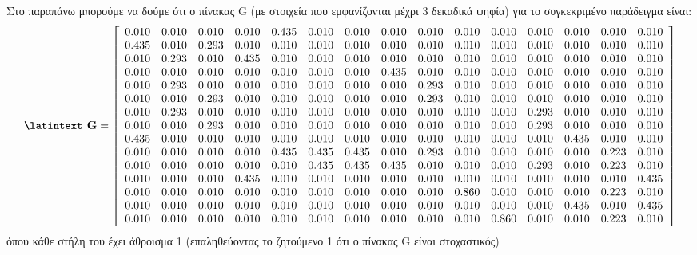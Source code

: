 \documentclass[a4paper,11pt]{article}
\newcommand{\lt}{\latintext}
\begin{document}
Στο παραπάνω μπορούμε να δούμε ότι ο πίνακας {\lt G} (με στοιχεία που εμφανίζονται μέχρι 3 δεκαδικά ψηφία) για το συγκεκριμένο παράδειγμα είναι:\\
\[\textbf{{\lt G}}=
    \left[ \begin{array}{ccccccccccccccc}
    0.010 & 0.010 & 0.010 & 0.010 & 0.435 & 0.010 & 0.010 & 0.010 & 0.010 & 0.010 & 0.010 & 0.010 & 0.010 & 0.010 & 0.010 \\
    0.435 & 0.010 & 0.293 & 0.010 & 0.010 & 0.010 & 0.010 & 0.010 & 0.010 & 0.010 & 0.010 & 0.010 & 0.010 & 0.010 & 0.010 \\
    0.010 & 0.293 & 0.010 & 0.435 & 0.010 & 0.010 & 0.010 & 0.010 & 0.010 & 0.010 & 0.010 & 0.010 & 0.010 & 0.010 & 0.010 \\
    0.010 & 0.010 & 0.010 & 0.010 & 0.010 & 0.010 & 0.010 & 0.435 & 0.010 & 0.010 & 0.010 & 0.010 & 0.010 & 0.010 & 0.010 \\
    0.010 & 0.293 & 0.010 & 0.010 & 0.010 & 0.010 & 0.010 & 0.010 & 0.293 & 0.010 & 0.010 & 0.010 & 0.010 & 0.010 & 0.010 \\
    0.010 & 0.010 & 0.293 & 0.010 & 0.010 & 0.010 & 0.010 & 0.010 & 0.293 & 0.010 & 0.010 & 0.010 & 0.010 & 0.010 & 0.010 \\
    0.010 & 0.293 & 0.010 & 0.010 & 0.010 & 0.010 & 0.010 & 0.010 & 0.010 & 0.010 & 0.010 & 0.293 & 0.010 & 0.010 & 0.010 \\
    0.010 & 0.010 & 0.293 & 0.010 & 0.010 & 0.010 & 0.010 & 0.010 & 0.010 & 0.010 & 0.010 & 0.293 & 0.010 & 0.010 & 0.010 \\
    0.435 & 0.010 & 0.010 & 0.010 & 0.010 & 0.010 & 0.010 & 0.010 & 0.010 & 0.010 & 0.010 & 0.010 & 0.435 & 0.010 & 0.010 \\
    0.010 & 0.010 & 0.010 & 0.010 & 0.435 & 0.435 & 0.435 & 0.010 & 0.293 & 0.010 & 0.010 & 0.010 & 0.010 & 0.223 & 0.010 \\
    0.010 & 0.010 & 0.010 & 0.010 & 0.010 & 0.435 & 0.435 & 0.435 & 0.010 & 0.010 & 0.010 & 0.293 & 0.010 & 0.223 & 0.010 \\
    0.010 & 0.010 & 0.010 & 0.435 & 0.010 & 0.010 & 0.010 & 0.010 & 0.010 & 0.010 & 0.010 & 0.010 & 0.010 & 0.010 & 0.435 \\
    0.010 & 0.010 & 0.010 & 0.010 & 0.010 & 0.010 & 0.010 & 0.010 & 0.010 & 0.860 & 0.010 & 0.010 & 0.010 & 0.223 & 0.010 \\
    0.010 & 0.010 & 0.010 & 0.010 & 0.010 & 0.010 & 0.010 & 0.010 & 0.010 & 0.010 & 0.010 & 0.010 & 0.435 & 0.010 & 0.435 \\
    0.010 & 0.010 & 0.010 & 0.010 & 0.010 & 0.010 & 0.010 & 0.010 & 0.010 & 0.010 & 0.860 & 0.010 & 0.010 & 0.223 & 0.010
    \end{array} \right]
\]
όπου κάθε στήλη του έχει άθροισμα 1 (επαληθεύοντας το ζητούμενο 1 ότι ο πίνακας {\lt G} είναι στοχαστικός)\\
\end{document}
